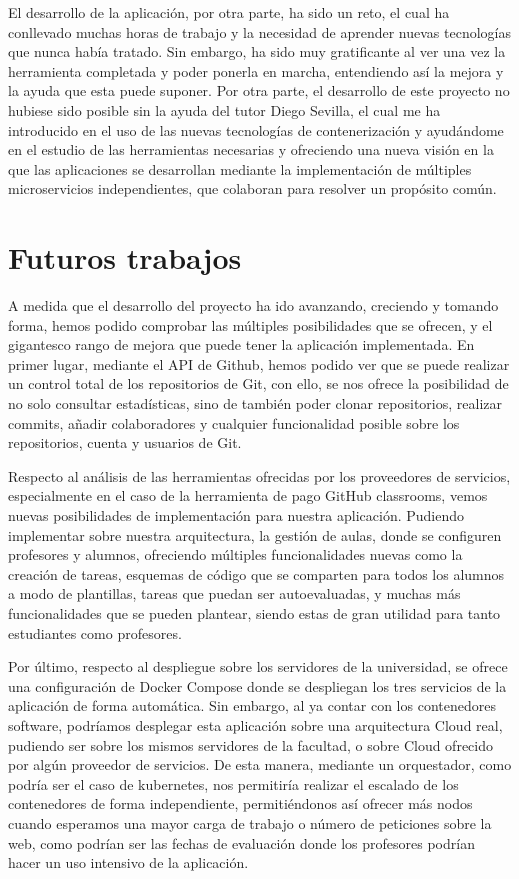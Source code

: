 El desarrollo de la aplicación, por otra parte, ha sido un reto, el cual ha
conllevado muchas horas de trabajo y la necesidad de aprender nuevas
tecnologías que nunca había tratado. Sin embargo, ha sido muy gratificante
al ver una vez la herramienta completada y poder ponerla en marcha,
entendiendo así la mejora y la ayuda que esta puede suponer. Por otra
parte, el desarrollo de este proyecto no hubiese sido posible sin la ayuda
del tutor Diego Sevilla, el cual me ha introducido en el uso de las nuevas
tecnologías de contenerización y ayudándome en el estudio de las
herramientas necesarias y ofreciendo una nueva visión en la que las
aplicaciones se desarrollan mediante la implementación de múltiples
microservicios independientes, que colaboran para resolver un propósito
común.


\section{Futuros trabajos}

A medida que el desarrollo del proyecto ha ido avanzando, creciendo y
tomando forma, hemos podido comprobar las múltiples posibilidades que se
ofrecen, y el gigantesco rango de mejora que puede tener la aplicación
implementada. En primer lugar, mediante el API de Github, hemos podido ver
que se puede realizar un control total de los repositorios de Git, con
ello, se nos ofrece la posibilidad de no solo consultar estadísticas, sino
de también poder clonar repositorios, realizar commits, añadir
colaboradores y cualquier funcionalidad posible sobre los repositorios,
cuenta y usuarios de Git.

Respecto al análisis de las herramientas ofrecidas por los proveedores de
servicios, especialmente en el caso de la herramienta de pago GitHub
classrooms, vemos nuevas posibilidades de implementación para nuestra
aplicación. Pudiendo implementar sobre nuestra arquitectura, la gestión de
aulas, donde se configuren profesores y alumnos, ofreciendo múltiples
funcionalidades nuevas como la creación de tareas, esquemas de código que
se comparten para todos los alumnos a modo de plantillas, tareas que puedan
ser autoevaluadas, y muchas más funcionalidades que se pueden plantear,
siendo estas de gran utilidad para tanto estudiantes como profesores.

Por último, respecto al despliegue sobre los servidores de la universidad,
se ofrece una configuración de Docker Compose donde se despliegan los tres
servicios de la aplicación de forma automática. Sin embargo, al ya contar
con los contenedores software, podríamos desplegar esta aplicación sobre
una arquitectura Cloud real, pudiendo ser sobre los mismos servidores de la
facultad, o sobre Cloud ofrecido por algún proveedor de servicios. De esta
manera, mediante un orquestador, como podría ser el caso de kubernetes, nos
permitiría realizar el escalado de los contenedores de forma independiente,
permitiéndonos así ofrecer más nodos cuando esperamos una mayor carga de
trabajo o número de peticiones sobre la web, como podrían ser las fechas de
evaluación donde los profesores podrían hacer un uso intensivo de la
aplicación.


